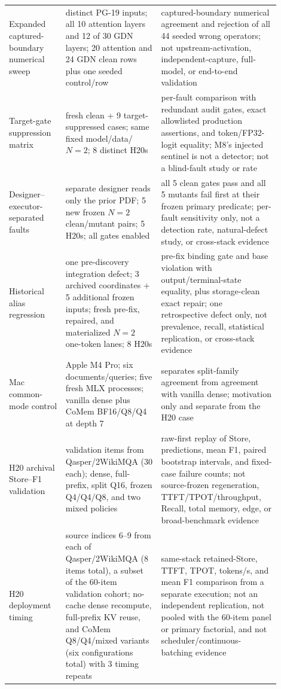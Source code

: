 \documentclass{article}
\begin{document}
\begin{longtable}{@{}>{\raggedright\arraybackslash}p{0.19\linewidth}>{\raggedright\arraybackslash}p{0.32\linewidth}>{\raggedright\arraybackslash}p{0.39\linewidth}@{}}
  Expanded captured-boundary numerical sweep & 2 distinct PG-19 inputs; all 10 attention layers and 12 of 30 GDN layers; 20 attention and 24 GDN clean rows plus one seeded control/row & captured-boundary numerical agreement and rejection of all 44 seeded wrong operators; not upstream-activation, independent-capture, full-model, or end-to-end validation \\
  Target-gate suppression matrix & 9 fresh clean + 9 target-suppressed cases; same fixed model/data/$N=2$; 8 distinct H20s & per-fault comparison with redundant audit gates, exact allowlisted production assertions, and token/FP32-logit equality; M8's injected sentinel is not a detector; not a blind-fault study or rate \\
  Designer--executor-separated faults & separate designer reads only the prior PDF; 5 new frozen $N=2$ clean/mutant pairs; 5 H20s; all gates enabled & all 5 clean gates pass and all 5 mutants fail first at their frozen primary predicate; per-fault sensitivity only, not a detection rate, natural-defect study, or cross-stack evidence \\
  Historical alias regression & one pre-discovery integration defect; 3 archived coordinates + 5 additional frozen inputs; fresh pre-fix, repaired, and materialized $N=2$ one-token lanes; 8 H20s & pre-fix binding gate and base violation with output/terminal-state equality, plus storage-clean exact repair; one retrospective defect only, not prevalence, recall, statistical replication, or cross-stack evidence \\
  Mac common-mode control & Apple M4 Pro; six documents/queries; five fresh MLX processes; vanilla dense plus CoMem BF16/Q8/Q4 at depth 7 & separates split-family agreement from agreement with vanilla dense; motivation only and separate from the H20 case \\
  H20 archival Store--F1 validation & 60 validation items from Qasper/2WikiMQA (30 each); dense, full-prefix, split Q16, frozen Q4/Q4/Q8, and two mixed policies & raw-first replay of Store, predictions, mean F1, paired bootstrap intervals, and fixed-case failure counts; not source-frozen regeneration, TTFT/TPOT/throughput, Recall, total memory, edge, or broad-benchmark evidence \\
  H20 deployment timing & source indices 6--9 from each of Qasper/2WikiMQA (8 items total), a subset of the 60-item validation cohort; no-cache dense recompute, full-prefix KV reuse, and CoMem Q8/Q4/mixed variants (six configurations total) with 3 timing repeats & same-stack retained-Store, TTFT, TPOT, tokens/s, and mean F1 comparison from a separate execution; not an independent replication, not pooled with the 60-item panel or primary factorial, and not scheduler/continuous-batching evidence \\

\end{longtable}
\end{document}
